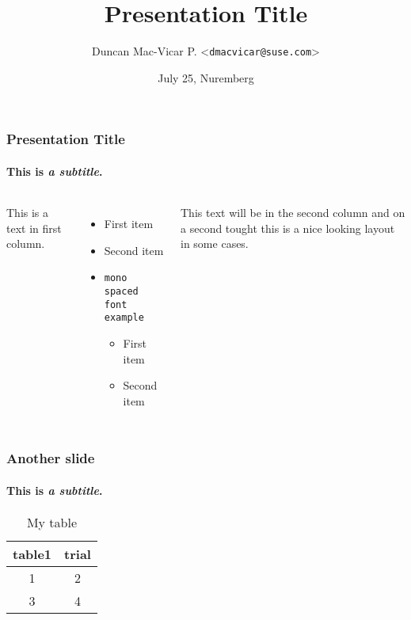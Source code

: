 \documentclass[aspectratio=169]{beamer}
\title{Presentation Title}
\date{July 25, Nuremberg}
\author{Duncan Mac-Vicar P. <\texttt{dmacvicar@suse.com}>}
\begin{document}
\begin{frame}
\titlepage
\end{frame}

\begin{frame} 
\frametitle{Presentation Title}
\framesubtitle{This is \textit{a subtitle}.}

\begin{columns}

This is a text in first column.
\begin{itemize}
  \item First item
  \item Second item
  \item \texttt{mono spaced font example}
  \begin{itemize}
    \item First item
    \item Second item
  \end{itemize}
\end{itemize}

This text will be in the second column
and on a second tought this is a nice looking
layout in some cases.
\end{columns}

\end{frame}

\begin{frame} 
\frametitle{Another slide}
\framesubtitle{This is \textit{a subtitle}.}

\begin{table}
  \begin{tabular}{c|c}
    table1 & trial \\
    \hline
    \hline
    1 & 2 \\
    3 & 4
  \end{tabular}
  \caption*{My table}
\end{table}     
\end{frame}
\end{document}
